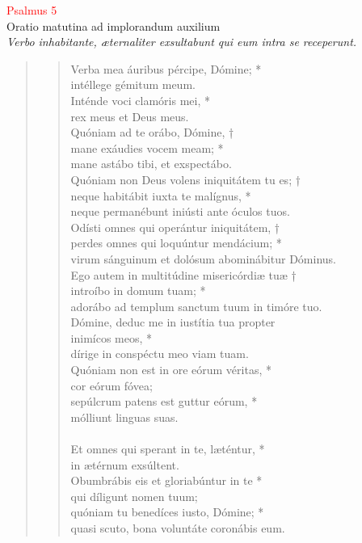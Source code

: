 
\begin{center}
 \textcolor{red}{Psalmus 5}\\
Oratio matutina ad implorandum auxilium\\
\textit{\small Verbo inhabitante, æternaliter exsultabunt qui eum intra se receperunt.}
\end{center}
\begin{quote}
 


\begin{verse}
Verba mea áuribus pércipe, Dómine; *\\
intéllege gémitum meum.\\
\vin Inténde voci clamóris mei, *\\
\vin rex meus et Deus meus.\\
Quóniam ad te orábo, Dómine, †\\
mane exáudies vocem meam; *\\
mane astábo tibi, et exspectábo.\\
\vin Quóniam non Deus volens iniquitátem tu es; †\\
\vin neque habitábit iuxta te malígnus, *\\
\vin neque permanébunt iniústi ante óculos tuos.\\
Odísti omnes qui operántur iniquitátem, †\\
perdes omnes qui loquúntur mendácium; *\\
virum sánguinum et dolósum abominábitur Dóminus.\\
\vin Ego autem in multitúdine misericórdiæ tuæ †\\
\vin introíbo in domum tuam; *\\
\vin adorábo ad templum sanctum tuum in timóre tuo.\\
Dómine, deduc me in iustítia tua propter\\ inimícos meos, *\\
dírige in conspéctu meo viam tuam.\\
\vin Quóniam non est in ore eórum véritas, *\\
\vin cor eórum fóvea;\\
sepúlcrum patens est guttur eórum, *\\
mólliunt linguas suas.\\
\\
Et omnes qui sperant in te, læténtur, *\\
in ætérnum exsúltent.\\
\vin Obumbrábis eis et gloriabúntur in te *\\
\vin qui díligunt nomen tuum;\\
quóniam tu benedíces iusto, Dómine; *\\
quasi scuto, bona voluntáte coronábis eum.\\
\end{verse}
\end{quote}
\vspace{1cm}



